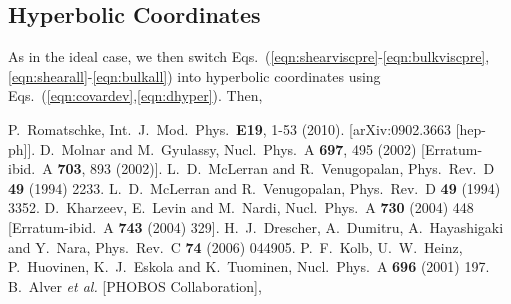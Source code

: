 \documentclass[aps,article]{revtex4}
\begin{document}
\subsection{Hyperbolic Coordinates}

As in the ideal case, we then switch Eqs.\ (\ref{eqn:shearviscpre}-\ref{eqn:bulkviscpre},\ref{eqn:shearall}-\ref{eqn:bulkall}) into hyperbolic coordinates using Eqs.\ (\ref{eqn:covardev},\ref{eqn:dhyper}). Then, 


\begin{thebibliography}{99}
  P.~Romatschke,
  Int.\ J.\ Mod.\ Phys.\  {\bf E19}, 1-53 (2010).
  [arXiv:0902.3663 [hep-ph]].
  D.~Molnar and M.~Gyulassy,
  Nucl.\ Phys.\  A {\bf 697}, 495 (2002)
  [Erratum-ibid.\  A {\bf 703}, 893 (2002)].
  L.~D.~McLerran and R.~Venugopalan,
  Phys.\ Rev.\  D {\bf 49} (1994) 2233.
  L.~D.~McLerran and R.~Venugopalan,
  Phys.\ Rev.\  D {\bf 49} (1994) 3352.
  D.~Kharzeev, E.~Levin and M.~Nardi,
  Nucl.\ Phys.\  A {\bf 730} (2004) 448
  [Erratum-ibid.\  A {\bf 743} (2004) 329].
  H.~J.~Drescher, A.~Dumitru, A.~Hayashigaki and Y.~Nara,
  Phys.\ Rev.\  C {\bf 74} (2006) 044905.
  P.~F.~Kolb, U.~W.~Heinz, P.~Huovinen, K.~J.~Eskola and K.~Tuominen,
  Nucl.\ Phys.\  A {\bf 696} (2001) 197.
  B.~Alver {\it et al.}  [PHOBOS Collaboration],

\end{thebibliography}
\end{document}
